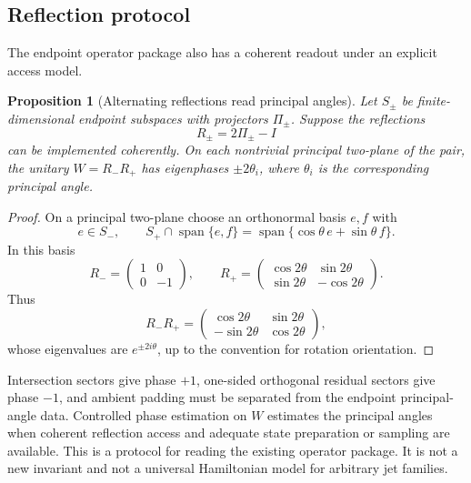 \documentclass[11pt]{amsart}
\newtheorem{proposition}[theorem]{Proposition}
\newcommand{\Span}{\operatorname{span}}
\newcommand{\Id}{I}
\newcommand{\Proj}{\Pi}
\begin{document}
\subsection{Reflection protocol}

The endpoint operator package also has a coherent readout under an explicit
access model.

\begin{proposition}[Alternating reflections read principal angles]
Let \(S_\pm\) be finite-dimensional endpoint subspaces with projectors
\(\Proj_\pm\). Suppose the reflections
\[
        R_\pm=2\Proj_\pm-\Id
\]
can be implemented coherently. On each nontrivial principal two-plane of the
pair, the unitary \(W=R_-R_+\) has eigenphases \(\pm2\theta_i\), where
\(\theta_i\) is the corresponding principal angle.
\end{proposition}

\begin{proof}
On a principal two-plane choose an orthonormal basis \(e,f\) with
\[
        e\in S_-,\qquad
        S_+\cap\Span\{e,f\}
        =
        \Span\{\cos\theta\,e+\sin\theta\,f\}.
\]
In this basis
\[
        R_-=
        \begin{pmatrix}
        1&0\\0&-1
        \end{pmatrix},
        \qquad
        R_+=
        \begin{pmatrix}
        \cos2\theta&\sin2\theta\\
        \sin2\theta&-\cos2\theta
        \end{pmatrix}.
\]
Thus
\[
        R_-R_+=
        \begin{pmatrix}
        \cos2\theta&\sin2\theta\\
        -\sin2\theta&\cos2\theta
        \end{pmatrix},
\]
whose eigenvalues are \(e^{\pm 2i\theta}\), up to the convention for rotation
orientation.
\end{proof}

Intersection sectors give phase \(+1\), one-sided orthogonal residual sectors
give phase \(-1\), and ambient padding must be separated from the endpoint
principal-angle data. Controlled phase estimation on \(W\) estimates the
principal angles when coherent reflection access and adequate state preparation
or sampling are available. This is a protocol for reading the existing
operator package. It is not a new invariant and not a universal Hamiltonian
model for arbitrary jet families.
\end{document}
